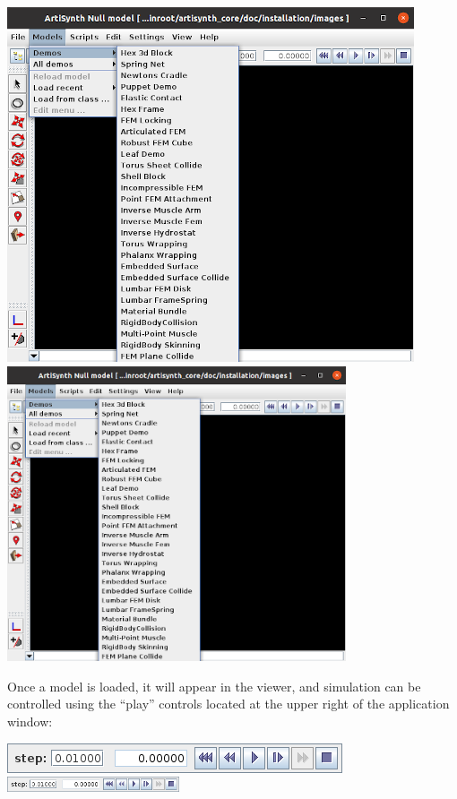 \begin{center}
\iflatexml
   \includegraphics[]{images/ArtiSynthDemoMenu}
\else
   \includegraphics[width=0.75\textwidth]{images/ArtiSynthDemoMenu}
\fi
\end{center}

Once a model is loaded, it will appear in the viewer, and simulation
can be controlled using the ``play'' controls located at the upper right
of the application window:

\begin{center}
\iflatexml
  \includegraphics[]{../uiguide/images/playControls}
\else
  \includegraphics[width=2in]{../uiguide/images/playControls}
\fi
\end{center}

